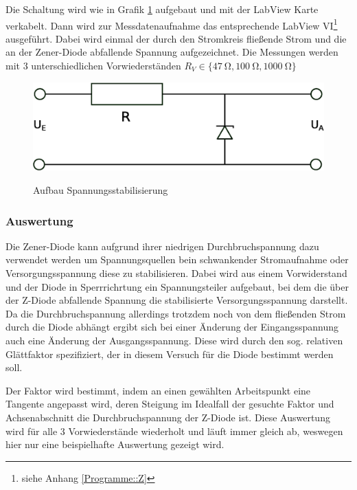 \documentclass[12pt,twoside,a4paper]{scrartcl}
\begin{document}
			Die Schaltung wird wie in Grafik \ref{Aufbau::Z} aufgebaut und mit der LabView Karte verkabelt. Dann wird zur Messdatenaufnahme das entsprechende LabView VI\footnote{siehe Anhang \ref{Programme::Z}} ausgeführt. Dabei wird einmal der durch den Stromkreis fließende Strom und die an der Zener-Diode abfallende Spannung aufgezeichnet. Die Messungen werden mit 3 unterschiedlichen Vorwiederständen $R_V \in \{ \SI{47}{\ohm}, \SI{100}{\ohm}, \SI{1000}{\ohm} \}$

			\begin{figure}[H]
				\centering

				\includegraphics[width = 0.8 \textwidth]{Pictures/zener}
				\label{Aufbau::Z}
				\caption{Aufbau Spannungsstabilisierung}
			\end{figure}

			\subsubsection{Auswertung}
				Die Zener-Diode kann aufgrund ihrer niedrigen Durchbruchspannung dazu verwendet werden um Spannungsquellen bein schwankender Stromaufnahme oder Versorgungsspannung diese zu stabilisieren. Dabei wird aus einem Vorwiderstand und der Diode in Sperrrichrtung ein Spannungsteiler aufgebaut, bei dem die über der Z-Diode abfallende Spannung die stabilisierte Versorgungsspannung darstellt. Da die Durchbruchspannung allerdings trotzdem noch von dem fließenden Strom durch die Diode abhängt ergibt sich bei einer Änderung der Eingangsspannung auch eine Änderung der Ausgangsspannung. Diese wird durch den sog. relativen Glättfaktor spezifiziert, der in diesem Versuch für die Diode bestimmt werden soll.

				Der Faktor wird bestimmt, indem an einen gewählten Arbeitspunkt eine Tangente angepasst wird, deren Steigung im Idealfall der gesuchte Faktor und Achsenabschnitt die Durchbruchspannung der Z-Diode ist.
				Diese Auswertung wird für alle 3 Vorwiederstände wiederholt und läuft immer gleich ab, weswegen hier nur eine beispielhafte Auswertung gezeigt wird.
\end{document}
